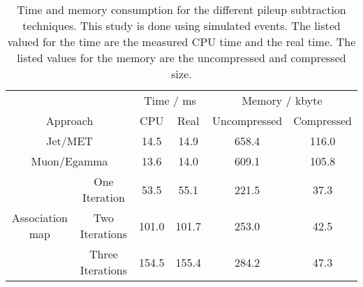 
\begin{table}[h]
\begin{center}
\caption{Time and memory consumption for the different pileup subtraction techniques. This study is done using simulated \ttbar events. The listed valued for the time are the measured CPU time and the real time. The listed values for the memory are the uncompressed and compressed size.}
\label{tab:OSPTimMemTT}

\begin{tabular}{c c c c c c}
 & & \multicolumn{2}{c}{Time / ms} & \multicolumn{2}{c}{Memory / kbyte}  \\
\multicolumn{2}{c}{Approach} & CPU & Real & Uncompressed & Compressed \\
\midrule[2pt]
\multicolumn{2}{c}{Jet/MET}  & 14.5 & 14.9 & 658.4  & 116.0 \\
\midrule
\multicolumn{2}{c}{Muon/Egamma}  & 13.6 & 14.0 & 609.1 & 105.8 \\
\midrule
\multirow{3}{*}{Association map} 
                        & One Iteration & 53.5 & 55.1 & 221.5 & 37.3 \\
\cmidrule{2-6}
                        & Two Iterations & 101.0 & 101.7 & 253.0 & 42.5 \\
\cmidrule{2-6}
                        & Three Iterations  & 154.5 & 155.4 & 284.2 & 47.3 \\

\end{tabular}

\end{center}
\end{table}